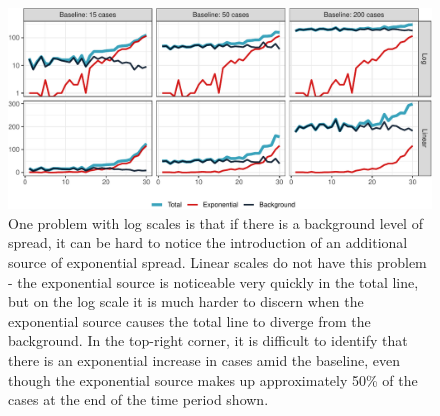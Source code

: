 \documentclass[article]{jdssv}\usepackage[]{graphicx}\usepackage[]{xcolor} %
\newenvironment{knitrout}{}{} %
\begin{document}
\begin{knitrout}\footnotesize
{}\color{fgcolor}\begin{figure}

{\centering \includegraphics[width=.95\linewidth]{Figures_R/fig-log-scale-failures-1} 

}

\caption[One problem with log scales is that if there is a background level of spread, it can be hard to notice the introduction of an additional source of exponential spread]{One problem with log scales is that if there is a background level of spread, it can be hard to notice the introduction of an additional source of exponential spread. Linear scales do not have this problem - the exponential source is noticeable very quickly in the total line, but on the log scale it is much harder to discern when the exponential source causes the total line to diverge from the background. In the top-right corner, it is difficult to identify that there is an exponential increase in cases amid the baseline, even though the exponential source makes up approximately 50\% of the cases at the end of the time period shown.}\label{fig:log-scale-failures}
\end{figure}

\end{knitrout}

\end{document}
